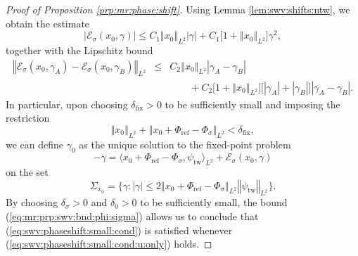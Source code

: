 \documentclass[10pt]{articleHJ}
\newcommand{\abs}[1]{\left\vert#1\right\vert}			%
\newcommand{\norm}[1]{\left\Vert#1\right\Vert}		%
\newcommand{\sref}[1]{(\ref{#1})}                       %
\numberwithin{equation}{section}
\begin{document}
\begin{proof}[Proof of Proposition \ref{prp:mr:phase:shift}]
Using Lemma \ref{lem:swv:shifts:ntw},
we obtain the estimate
\begin{equation}
|\mathcal{E}_{\sigma}(x_0, \gamma)|
  \le C_1 \norm{x_0}_{L^2} \abs{ \gamma }
   + C_1 \big[ 1 + \norm{x_0}_{L^2} \big]
     \gamma^2 ,
\end{equation}
together with the Lipschitz bound
\begin{equation}
\begin{array}{lcl}
\norm{\mathcal{E}_{\sigma}(x_0, \gamma_A)
 -  \mathcal{E}_{\sigma}(x_0, \gamma_B) }_{L^2}
  & \le &
   C_2 \norm{x_0}_{L^2} \abs{ \gamma_A - \gamma_B }
\\[0.2cm]
& & \qquad
   + C_2 \big[ 1 + \norm{x_0}_{L^2} \big]
     \big[\abs{ \gamma_A } + \abs{\gamma_B} \big]
       \abs{\gamma_A - \gamma_B}.
\end{array}
\end{equation}
In particular, upon choosing $\delta_{\mathrm{fix}} > 0$ to be sufficiently small
and imposing the restriction
\begin{equation}
\label{eq:swv:phaseshift:small:cond}
\norm{x_0}_{L^2} +  \norm{x_0 + \Phi_{\mathrm{ref}} - \Phi_{\sigma} }_{L^2} <
  \delta_{\mathrm{fix}},
\end{equation}
we can define
$\gamma_0$ as the unique solution to the
fixed-point problem
\begin{equation}
- \gamma =
\langle x_0 + \Phi_{\mathrm{ref}} - \Phi_{\sigma} , \psi_{\mathrm{tw}} \rangle_{L^2}
 + \mathcal{E}_{\sigma}(x_0, \gamma)
\end{equation}
on the set
\begin{equation}
\Sigma_{x_0} = \{ \gamma: \abs{\gamma} \le 2 \norm{x_0 + \Phi_{\mathrm{ref}} - \Phi_{\sigma} }_{L^2}
  \norm{\psi_{\mathrm{tw}}}_{L^2} \}.
\end{equation}
By choosing $\delta_{\sigma} > 0$ and $\delta_0 > 0$
to be sufficiently small,
the bound \sref{eq:mr:prp:swv:bnd:phi:sigma}
allows us to conclude that \sref{eq:swv:phaseshift:small:cond}
is satisfied whenever
\sref{eq:swv:phaseshift:small:cond:u:only} holds.


\end{proof}
\end{document}
